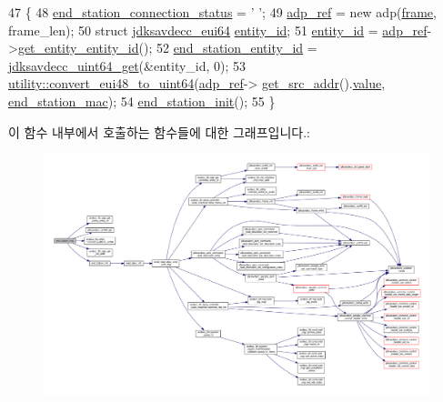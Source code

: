 \begin{DoxyCode}
47 \{
48     \hyperlink{classavdecc__lib_1_1end__station__imp_ac5fdc13743115b94ade40fd1a74e97c3}{end\_station\_connection\_status} = \textcolor{charliteral}{' '};
49     \hyperlink{classavdecc__lib_1_1end__station__imp_a0b7b5ce956637a18c695ba20f2d4908c}{adp\_ref} = \textcolor{keyword}{new} adp(\hyperlink{gst__avb__playbin_8c_ac8e710e0b5e994c0545d75d69868c6f0}{frame}, frame\_len);
50     \textcolor{keyword}{struct }\hyperlink{structjdksavdecc__eui64}{jdksavdecc\_eui64} \hyperlink{classavdecc__lib_1_1end__station__imp_a363b6c9664a0d701def9b17863e20ad3}{entity\_id};
51     \hyperlink{classavdecc__lib_1_1end__station__imp_a363b6c9664a0d701def9b17863e20ad3}{entity\_id} = \hyperlink{classavdecc__lib_1_1end__station__imp_a0b7b5ce956637a18c695ba20f2d4908c}{adp\_ref}->\hyperlink{classavdecc__lib_1_1adp_a7be0469ca6e8e700bde8d2c2b084fa49}{get\_entity\_entity\_id}();
52     \hyperlink{classavdecc__lib_1_1end__station__imp_ac32ac278fb799e1b4f0cd539e0abe2b5}{end\_station\_entity\_id} = \hyperlink{group__endian_gac8c2b48b7d7db101708e0197e366ac42}{jdksavdecc\_uint64\_get}(&entity\_id, 0);
53     \hyperlink{namespaceavdecc__lib_1_1utility_a93805682670fa173878eaecac28efc2c}{utility::convert\_eui48\_to\_uint64}(\hyperlink{classavdecc__lib_1_1end__station__imp_a0b7b5ce956637a18c695ba20f2d4908c}{adp\_ref}->
      \hyperlink{classavdecc__lib_1_1adp_ab8b2f825ae066d2064b2589a80a9e5a3}{get\_src\_addr}().\hyperlink{structjdksavdecc__eui48_a18b93f04637cf37688ec10a33a0cbc26}{value}, \hyperlink{classavdecc__lib_1_1end__station__imp_a0e9fa7b31d903107ff9e7aac9dac172d}{end\_station\_mac});
54     \hyperlink{classavdecc__lib_1_1end__station__imp_a86c3a7a61fd1446d88bd8c33067b1c0c}{end\_station\_init}();
55 \}
\end{DoxyCode}


이 함수 내부에서 호출하는 함수들에 대한 그래프입니다.\+:
\nopagebreak
\begin{figure}[H]
\begin{center}
\leavevmode
\includegraphics[width=350pt]{classavdecc__lib_1_1end__station__imp_a4d219a92ae6270d47ba29d3315ef0f7c_cgraph}
\end{center}
\end{figure}


